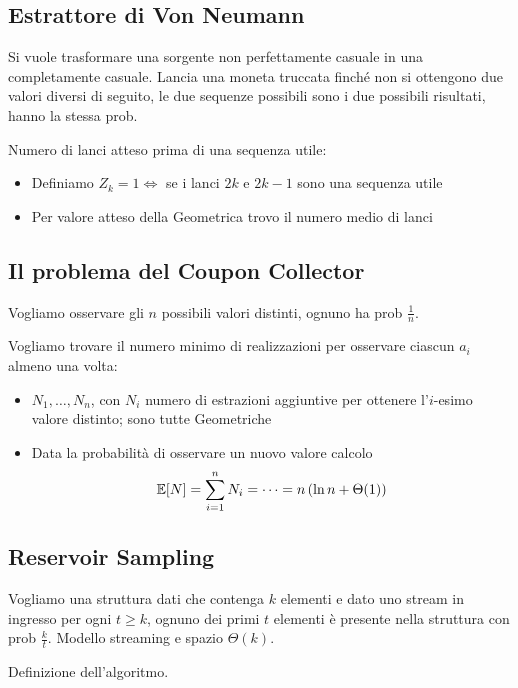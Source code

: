 \subsection{Estrattore di Von Neumann}

Si vuole trasformare una sorgente non perfettamente casuale in una completamente casuale. Lancia una moneta truccata finché non si ottengono due valori diversi di seguito, le due sequenze possibili sono i due possibili risultati, hanno la stessa prob.

Numero di lanci atteso prima di una sequenza utile:
\begin{itemize}
	\item Definiamo $Z_k = 1 \Leftrightarrow$ se i lanci $2k$ e $2k-1$ sono una sequenza utile

	\item Per valore atteso della Geometrica trovo il numero medio di lanci
\end{itemize}

\subsection{Il problema del Coupon Collector}

Vogliamo osservare gli $n$ possibili valori distinti, ognuno ha prob $\frac{1}{n}$.

Vogliamo trovare il numero minimo di realizzazioni per osservare ciascun $a_i$ almeno una volta:
\begin{itemize}
	\item $N_1, \dots, N_n$, con $N_i$ numero di estrazioni aggiuntive per ottenere l'$i$-esimo valore distinto; sono tutte Geometriche

	\item Data la probabilità di osservare un nuovo valore calcolo
	$$ \mathbb{E} [N] = \sum_{i = 1}^n N_i = \dots = n \left(\ln n + \Theta (1)\right) $$
\end{itemize}

\subsection{Reservoir Sampling}

Vogliamo una struttura dati che contenga $k$ elementi e dato uno stream in ingresso per ogni $t \geq k$, ognuno dei primi $t$ elementi è presente nella struttura con prob $\frac{k}{t}$. Modello streaming e spazio $\Theta (k)$.

Definizione dell'algoritmo.

